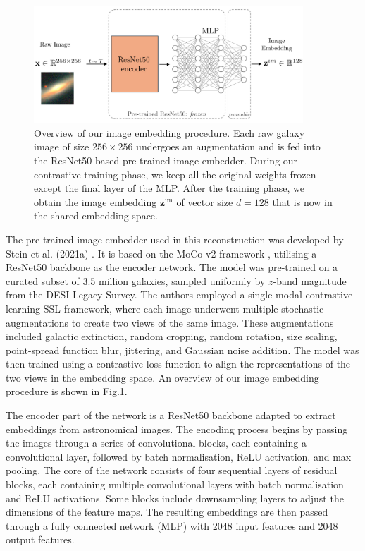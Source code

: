 \documentclass[draft, a4paper,12pt]{article}
\begin{document}
\begin{figure}[H]
    \centering
    \includegraphics[width=0.9\textwidth]{../figures/diagram_resnet.pdf}
    \caption{Overview of our image embedding procedure. Each raw galaxy image of size $256 \times 256$ undergoes an augmentation and is fed into the ResNet50 based pre-trained image embedder. During our contrastive training phase, we keep all the original weights frozen except the final layer of the MLP. After the training phase, we obtain the image embedding $\mathbf{z}^{\text{im}}$ of vector size $d=128$ that is now in the shared embedding space.}
    \label{fig:resnet}
\end{figure}
The pre-trained image embedder used in this reconstruction was developed by Stein et al. (2021a) \cite{stein}. It is based on the MoCo v2 framework \cite{mocov2}, utilising a ResNet50 backbone as the encoder network. The model was pre-trained on a curated subset of 3.5 million galaxies, sampled uniformly by $z$-band magnitude from the DESI Legacy Survey. The authors employed a single-modal contrastive learning SSL framework, where each image underwent multiple stochastic augmentations to create two views of the same image. These augmentations included galactic extinction, random cropping, random rotation, size scaling, point-spread function blur, jittering, and Gaussian noise addition. The model was then trained using a contrastive loss function to align the representations of the two views in the embedding space. An overview of our image embedding procedure is shown in Fig.\ref{fig:resnet}.

The encoder part of the network is a ResNet50 backbone adapted to extract embeddings from astronomical images. The encoding process begins by passing the images through a series of convolutional blocks, each containing a convolutional layer, followed by batch normalisation, ReLU activation, and max pooling. The core of the network consists of four sequential layers of residual blocks, each containing multiple convolutional layers with batch normalisation and ReLU activations. Some blocks include downsampling layers to adjust the dimensions of the feature maps. The resulting embeddings are then passed through a fully connected network (MLP) with 2048 input features and 2048 output features.
\end{document}
